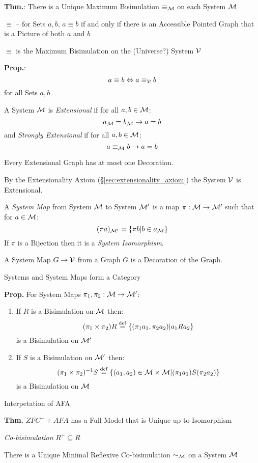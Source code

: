 \textbf{Thm.}: There is a Unique Maximum Bisimulation
$\equiv_\mathcal{M}$ on each System $\mathcal{M}$

$\equiv$ -- for Sets $a,b$, $a \equiv b$ if and only if there is an
Accessible Pointed Graph that is a Picture of both $a$ and $b$

$\equiv$ is the Maximum Bisimulation on the (Universe?) System
$\mathcal{V}$ %

\textbf{Prop.}:
\[
  a \equiv b \Leftrightarrow a \equiv_\mathcal{V} b
\]
for all Sets $a,b$

A System $\mathcal{M}$ is \emph{Extensional} if for all $a,b \in
\mathcal{M}$:
\[
  a_\mathcal{M} = b_\mathcal{M} \to a = b
\]
and \emph{Strongly Extensional} if for all $a,b \in \mathcal{M}$:
\[
  a \equiv_\mathcal{M} b \to a = b
\]

Every Extensional Graph has at most one Decoration.

By the Extensionality Axiom (\S\ref{sec:extensionality_axiom}) the
System $\mathcal{V}$ is Extensional.

A \emph{System Map} from System $\mathcal{M}$ to System $\mathcal{M}'$ is
a map $\pi : \mathcal{M} \to \mathcal{M}'$ such that for $a \in
\mathcal{M}$:
\[
  (\pi a)_{\mathcal{M}'} = \{ \pi b | b \in a_\mathcal{M} \}
\]
If $\pi$ is a Bijection then it is a \emph{System Isomorphism}.

A System Map $G \to \mathcal{V}$ from a Graph $G$ is a
Decoration of the Graph.

Systems and System Maps form a Category %

\textbf{Prop.} For System Maps $\pi_1,\pi_2 : \mathcal{M} \to
\mathcal{M}'$:
\begin{enumerate}
  \item If $R$ is a Bisimulation on $\mathcal{M}$ then:
    \[
      (\pi_1 \times \pi_2) R
        \stackrel{\mathrm{def}}= \{(\pi_1 a_1, \pi_2 a_2) | a_1 R a_2\}
    \]
    is a Bisimulation on $\mathcal{M}'$
  \item If $S$ is a Bisimulation on $\mathcal{M}'$ then:
    \[
      (\pi_1 \times \pi_2)^{-1}S
        \stackrel{\mathrm{def}}= \{(a_1,a_2) \in \mathcal{M} \times \mathcal{M}
        | (\pi_1 a_1) S (\pi_2 a_2)\}
    \]
    is a Bisimulation on $\mathcal{M}$
\end{enumerate}

Interpetation of AFA %

\textbf{Thm.} $ZFC^- + AFA$ has a Full Model that is Unique up to
Isomorphism

\emph{Co-bisimulation} $R^+ \subseteq R$

There is a Unique Minimal Reflexive Co-bisimulation $\sim_\mathcal{M}$
on a System $\mathcal{M}$

